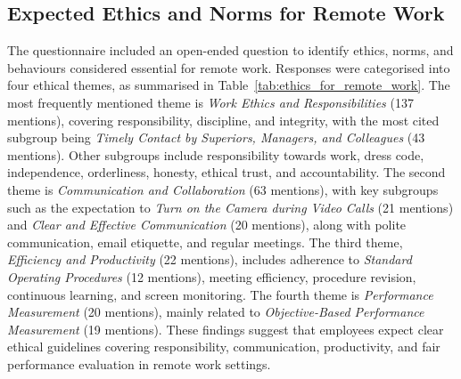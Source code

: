 \documentclass[conference]{IEEEtran}
\begin{document}
\subsection{Expected Ethics and Norms for Remote Work}
\label{sec:ethics-remote-work}

The questionnaire included an open-ended question to identify ethics, norms, and behaviours considered essential for remote work. Responses were categorised into four ethical themes, as summarised in Table~\ref{tab:ethics_for_remote_work}. The most frequently mentioned theme is \textit{Work Ethics and Responsibilities} (137 mentions), covering responsibility, discipline, and integrity, with the most cited subgroup being \textit{Timely Contact by Superiors, Managers, and Colleagues} (43 mentions). Other subgroups include responsibility towards work, dress code, independence, orderliness, honesty, ethical trust, and accountability. The second theme is \textit{Communication and Collaboration} (63 mentions), with key subgroups such as the expectation to \textit{Turn on the Camera during Video Calls} (21 mentions) and \textit{Clear and Effective Communication} (20 mentions), along with polite communication, email etiquette, and regular meetings. The third theme, \textit{Efficiency and Productivity} (22 mentions), includes adherence to \textit{Standard Operating Procedures} (12 mentions), meeting efficiency, procedure revision, continuous learning, and screen monitoring. The fourth theme is \textit{Performance Measurement} (20 mentions), mainly related to \textit{Objective-Based Performance Measurement} (19 mentions). These findings suggest that employees expect clear ethical guidelines covering responsibility, communication, productivity, and fair performance evaluation in remote work settings.
\end{document}

